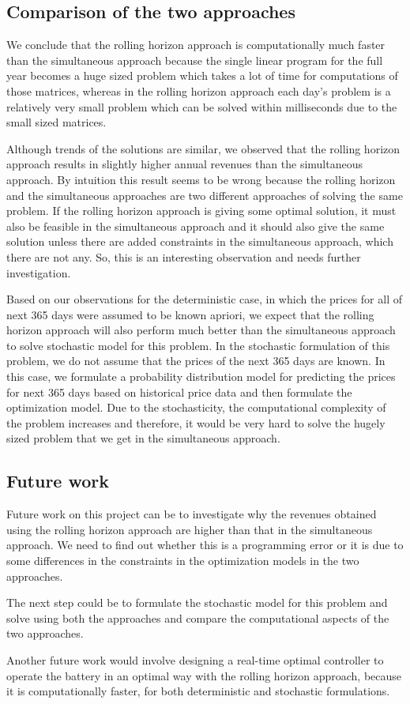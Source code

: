 \documentclass[11pt,twoside]{article}
\begin{document}
\subsection{Comparison of the two approaches}
We conclude that the rolling horizon approach is computationally much faster than the simultaneous approach because the single linear program for the full year becomes a huge sized problem which takes a lot of time for computations of those matrices, whereas in the rolling horizon approach each day's problem is a relatively very small problem which can be solved within milliseconds due to the small sized matrices.

Although trends of the solutions are similar, we observed that the rolling horizon approach results in slightly higher annual revenues than the simultaneous approach. By intuition this result seems to be wrong because the rolling horizon and the simultaneous approaches are two different approaches of solving the same problem. If the rolling horizon approach is giving some optimal solution, it must also be feasible in the simultaneous approach and it should also give the same solution unless there are added constraints in the simultaneous approach, which there are not any. So, this is an interesting observation and needs further investigation.

Based on our observations for the deterministic case, in which the prices for all of next 365 days were assumed to be known apriori, we expect that the rolling horizon approach will also perform much better than the simultaneous approach to solve stochastic model for this problem. In the stochastic formulation of this problem, we do not assume that the prices of the next 365 days are known. In this case, we formulate a probability distribution model for predicting the prices for next 365 days based on historical price data and then formulate the optimization model. Due to the stochasticity, the computational complexity of the problem increases and therefore, it would be very hard to solve the hugely sized problem that we get in the simultaneous approach.


\subsection{Future work}
Future work on this project can be to investigate why the revenues obtained using the rolling horizon approach are higher than that in the simultaneous approach. We need to find out whether this is a programming error or it is due to some differences in the constraints in the optimization models in the two approaches.

The next step could be to formulate the stochastic model for this problem and solve using both the approaches and compare the computational aspects of the two approaches.

Another future work would involve designing a real-time optimal controller to operate the battery in an optimal way with the rolling horizon approach, because it is computationally faster, for both deterministic and stochastic formulations.
\end{document}
